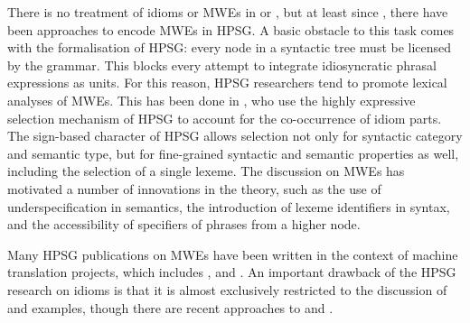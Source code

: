 \documentclass[output=paper]{langsci/langscibook}
\begin{document}
There is no treatment of idioms or MWEs in \citet{Pollard:Sag:87} or \citet{Pollard:Sag:94}, but at least since \citet{Krenn:Erbach:94}, there have been approaches to encode MWEs in HPSG. A basic obstacle to this task comes with the formalisation of HPSG: every node in a syntactic tree must be licensed by the grammar. 
This blocks every attempt to integrate idiosyncratic phrasal expressions as units. For this reason, HPSG researchers tend to promote lexical analyses of MWEs. 
This has been done in \citet{Krenn:Erbach:94}, who use the highly expressive selection mechanism of HPSG to account for the co-occurrence of idiom parts. 
The sign-based character of HPSG allows selection not only for syntactic category and semantic type, but for fine-grained syntactic and semantic properties as well, including the selection of a single lexeme. 
The discussion on MWEs has motivated a number of innovations in the theory, such as the use of underspecification in semantics, the introduction of lexeme identifiers in syntax, and the accessibility of specifiers of phrases from a higher node.

Many HPSG publications on MWEs have been written in the context of machine translation projects, which includes \citet{Krenn:Erbach:94}, \citet{Copestake:al:95} and \citet{Sag:2002}.  
An important drawback of the HPSG research on idioms is that it is almost exclusively restricted to the discussion of  and  examples, though there are recent approaches to  \citep{Sheinfux:al:15}  and   \citep{Haugereid:Bond:11}.
\end{document}
